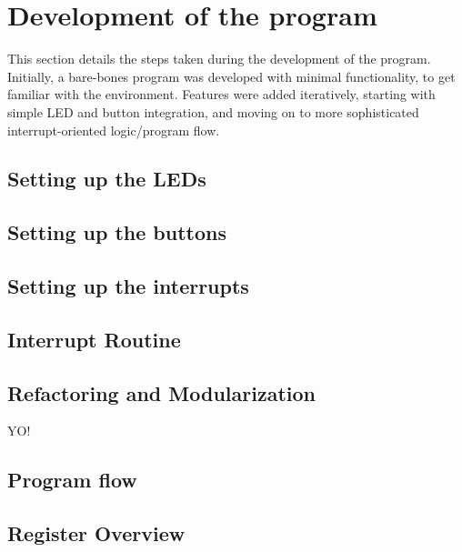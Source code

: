         

\section{Development of the program}

This section details the steps taken during the development of the program.
Initially, a bare-bones program was developed with minimal functionality, to get familiar with the environment.
Features were added iteratively, starting with simple LED and button integration, and moving on to more sophisticated interrupt-oriented logic/program flow.

    \subsection{Setting up the LEDs}
        
        

    \subsection{Setting up the buttons}

        

    \subsection{Setting up the interrupts}

        

    \subsection{Interrupt Routine}
        

    \subsection{Refactoring and Modularization}

        YO!

    \subsection{Program flow}

        

    \subsection{Register Overview}

        

